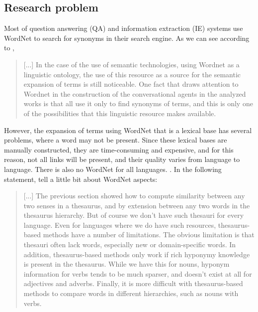 \subsection{Research problem} 

Most of question answering (QA) and information extraction (IE) systems use WordNet to search for synonyms in their search engine. As we can see according to , 
\begin{quote}
    [...] In the case of the use of semantic technologies, using Wordnet as a linguistic ontology, the use of this resource as a source for the semantic expansion of terms is still noticeable. One fact that draws attention to Wordnet in the construction of the conversational agents in the analyzed works is that all use it only to find synonyms of terms, and this is only one of the possibilities that this linguistic resource makes available.
\end{quote}

However, the expansion of terms using WordNet that is a lexical base has several problems, where a word may not be present. Since these lexical bases are manually constructed, they are time-consuming and expensive, and for this reason, not all links will be present, and their quality varies from language to language. There is also no WordNet for all languages. \cite{Leeuwenberga2016}. In the following statement,  tell a little bit about WordNet aspects:
\begin{quote}
    [...]
    The previous section showed how to compute similarity between any two senses in a thesaurus, and by extension between any two words in the thesaurus hierarchy. But of course we don't have such thesauri for every language. Even for languages where we do have such resources, thesaurus-based methods have a number of limitations. The obvious limitation is that thesauri often lack words, especially new or domain-specific words. In addition, thesaurus-based methods only work if rich hyponymy knowledge is present in the thesaurus. While we have this for nouns, hyponym information for verbs tends to be much sparser, and doesn't exist at all for adjectives and adverbs. Finally, it is more difficult with thesaurus-based methods to compare words in different hierarchies, such as nouns with verbs.
\end{quote}

